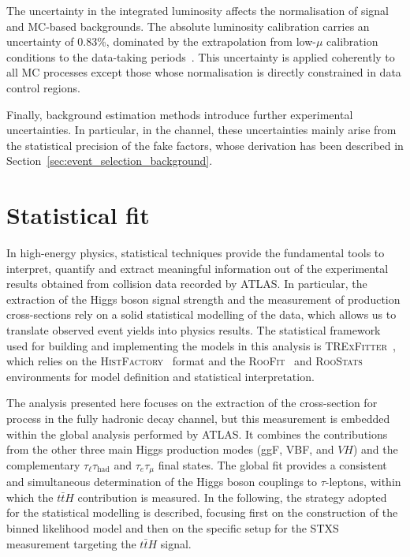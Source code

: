 The uncertainty in the integrated luminosity affects the normalisation of signal and MC-based backgrounds. The absolute luminosity calibration carries an uncertainty of 0.83\%, dominated by the extrapolation from low-$\mu$ calibration conditions to the data-taking periods~\cite{ATLAS-CONF-2019-021}. This uncertainty is applied coherently to all MC processes except those whose normalisation is directly constrained in data control regions.  

Finally, background estimation methods introduce further experimental uncertainties. In particular, in the \ttHtt channel, these uncertainties mainly arise from the statistical precision of the fake factors, whose derivation has been described in Section~\ref{sec:event_selection_background}.




\section{Statistical fit}
\label{sec:statistical_tth}

In high-energy physics, statistical techniques provide the fundamental tools to interpret, quantify and extract meaningful information out of the experimental results obtained from collision data recorded by ATLAS.
In particular, the extraction of the Higgs boson signal strength and the measurement of production cross-sections rely on a solid statistical modelling of the data, which allows us to translate observed event yields into physics results. 
The statistical framework used for building and implementing the models in this analysis is \textsc{TRExFitter}~\cite{trexfitter}, which relies on the \textsc{HistFactory}~\cite{histfactory} format and the \textsc{RooFit}~\cite{roofit} and \textsc{RooStats}~\cite{roostats} environments for model definition and statistical interpretation. 

The analysis presented here focuses on the extraction of the cross-section for \ttHtt process in the fully hadronic decay channel, but this measurement is embedded within the global \htautau analysis performed by ATLAS. It combines the contributions from the other three main Higgs production modes (ggF, VBF, and $VH$) and the complementary $\tau_{\ell}\tau_{\mathrm{had}}$ and $\tau_{e}\tau_{\mu}$ final states. 
The global fit provides a consistent and simultaneous determination of the Higgs boson couplings to $\tau$-leptons, within which the $t\bar{t}H$ contribution is measured. 
In the following, the strategy adopted for the statistical modelling is described, focusing first on the construction of the binned likelihood model and then on the specific setup for the STXS measurement targeting the $t\bar{t}H$ signal.

